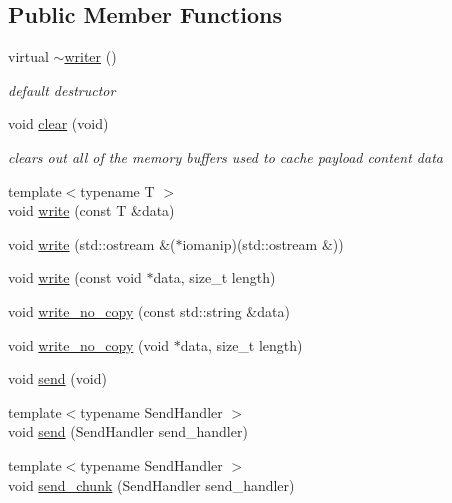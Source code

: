 \subsection*{Public Member Functions}
\begin{DoxyCompactItemize}
\item 
virtual \hyperlink{classpion_1_1http_1_1writer_ae8a84fa8012af64f2b5c22582f37f0ef}{$\sim$writer} ()
\begin{DoxyCompactList}\small\item\em default destructor \end{DoxyCompactList}\item 
void \hyperlink{classpion_1_1http_1_1writer_a17e88be48ecde04b8dbe54239a14dc25}{clear} (void)
\begin{DoxyCompactList}\small\item\em clears out all of the memory buffers used to cache payload content data \end{DoxyCompactList}\item 
{\footnotesize template$<$typename T $>$ }\\void \hyperlink{classpion_1_1http_1_1writer_a5959a2c14149da804ce62fe52b009596}{write} (const T \&data)
\item 
void \hyperlink{classpion_1_1http_1_1writer_aaa847dd2364e85844395fc4815a654ca}{write} (std\-::ostream \&($\ast$iomanip)(std\-::ostream \&))
\item 
void \hyperlink{classpion_1_1http_1_1writer_a8b0b29526fb03597934145eb9f21e932}{write} (const void $\ast$data, size\-\_\-t length)
\item 
void \hyperlink{classpion_1_1http_1_1writer_ad82908f247f558770c6c4d9f58d2a5f2}{write\-\_\-no\-\_\-copy} (const std\-::string \&data)
\item 
void \hyperlink{classpion_1_1http_1_1writer_a33832b2c08f3696a50614d0ad3c886a9}{write\-\_\-no\-\_\-copy} (void $\ast$data, size\-\_\-t length)
\item 
void \hyperlink{classpion_1_1http_1_1writer_a6c96aa95d710babcf5096d8294f703d5}{send} (void)
\item 
{\footnotesize template$<$typename Send\-Handler $>$ }\\void \hyperlink{classpion_1_1http_1_1writer_a7f258348ea914b41591c30a226b9d6a5}{send} (Send\-Handler send\-\_\-handler)
\item 
{\footnotesize template$<$typename Send\-Handler $>$ }\\void \hyperlink{classpion_1_1http_1_1writer_ab84706ce61c770b5d38e42f0da52b678}{send\-\_\-chunk} (Send\-Handler send\-\_\-handler)

\end{DoxyCompactItemize}
